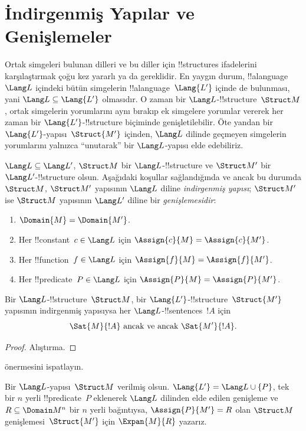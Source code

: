\documentclass[../../../include/open-logic-section]{subfiles}
\begin{document}
\section{İndirgenmiş Yapılar ve Genişlemeler}

Ortak simgeleri bulunan dilleri ve bu diller için !!{structure}s
ifadelerini karşılaştırmak çoğu kez yararlı ya da gereklidir. En yaygın
durum, !!a{language}~$\Lang L$ içindeki bütün simgelerin
!!a{language}~$\Lang{L'}$ içinde de bulunması, yani
$\Lang L\subseteq\Lang{L'}$ olmasıdır. O zaman bir
$\Lang L$-!!{structure}~$\Struct M$, ortak simgelerin yorumlarını aynı
bırakıp ek simgelere yorumlar vererek her zaman bir
$\Lang{L'}$-!!{structure} biçiminde genişletilebilir. Öte yandan bir
$\Lang{L'}$-yapısı~$\Struct{M'}$ içinden, $\Lang L$ dilinde geçmeyen
simgelerin yorumlarını yalnızca ``unutarak'' bir $\Lang L$-yapısı elde
edebiliriz.

\begin{defn}
$\Lang L\subseteq\Lang L'$, $\Struct M$ bir $\Lang L$-!!{structure}
ve $\Struct M'$ bir $\Lang L'$-!!{structure} olsun. Aşağıdaki koşullar
sağlandığında ve ancak bu durumda $\Struct M$, $\Struct M'$ yapısının
$\Lang L$ diline \emph{indirgenmiş yapısı}; $\Struct M'$ ise
$\Struct M$ yapısının $\Lang L'$ diline bir \emph{genişlemesidir}:
\begin{enumerate}
\item $\Domain{M}=\Domain{M'}$.
\item Her !!{constant}~$c\in\Lang L$ için
  $\Assign{c}{M}=\Assign{c}{M'}$.
\item Her !!{function}~$f\in\Lang L$ için
  $\Assign{f}{M}=\Assign{f}{M'}$.
\item Her !!{predicate}~$P\in\Lang L$ için
  $\Assign{P}{M}=\Assign{P}{M'}$.
\end{enumerate}
\end{defn}

\begin{prop}
Bir $\Lang L$-!!{structure}~$\Struct M$, bir
$\Lang{L'}$-!!{structure}~$\Struct{M'}$ yapısının indirgenmiş yapısıysa
her $\Lang L$-!!{sentence}s~$!A$ için
\[
\Sat{M}{!A} \text{ ancak ve ancak } \Sat{M'}{!A}.
\]
\end{prop}

\begin{proof}
  Alıştırma.
\end{proof}

\begin{prob}
 önermesini ispatlayın.
\end{prob}

\begin{defn}
Bir $\Lang L$-yapısı~$\Struct M$ verilmiş olsun. $\Lang{L'}=
\Lang L\cup\{P\}$, tek bir $n$ yerli !!{predicate}~$P$ eklenerek
$\Lang L$ dilinden elde edilen genişleme ve $R\subseteq\Domain M^n$
bir $n$ yerli bağıntıysa, $\Assign{P}{M'}=R$ olan $\Struct M$
genişlemesi~$\Struct{M'}$ için $\Expan{M}{R}$ yazarız.
\end{defn}
\end{document}
